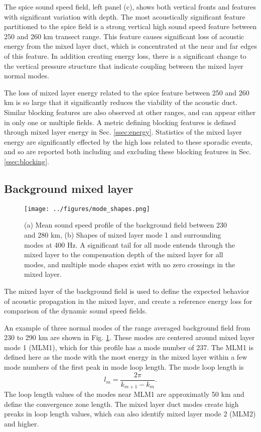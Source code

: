\documentclass[preprint,NumberedRefs]{JASA}
\begin{document}
The spice sound speed field, left panel (c), shows both vertical fronts and features with significant variation with depth. The most acoustically significant feature partitioned to the spice field is a strong vertical high sound speed feature between 250 and 260 km transect range. This feature causes significant loss of acoustic energy from the mixed layer duct, which is concentrated at the near and far edges of this feature. In addition creating energy loss, there is a significant change to the vertical pressure structure that indicate coupling between the mixed layer normal modes.

The loss of mixed layer energy related to the spice feature between 250 and 260 km is so large that it significantly reduces the viability of the acoustic duct. Similar blocking features are also observed at other ranges, and can appear either in only one or multiple fields. A metric defining blocking features is defined through mixed layer energy in Sec. \ref{ssec:energy}. Statistics of the mixed layer energy are significantly effected by the high loss related to these sporadic events, and so are reported both including and excluding these blocking features in Sec. \ref{ssec:blocking}.

\subsection{Background mixed layer}\label{ssec:modes}
\begin{figure}
\texttt{[image: ../figures/mode\_shapes.png]}
    \caption{\label{fig:bg_modes}{(a) Mean sound speed profile of the background field between 230 and 280 km, (b) Shapes of mixed layer mode 1 and surrounding modes at 400 Hz. A significant tail for all mode entends through the mixed layer to the compensation depth of the mixed layer for all modes, and multiple mode shapes exist with no zero crossings in the mixed layer.}}
\end{figure}
The mixed layer of the background field is used to define the expected behavior of acoustic propagation in the mixed layer, and create a reference energy loss for comparison of the dynamic sound speed fields.

An example of three normal modes of the range averaged background field from 230 to 290 km are shown in Fig. \ref{fig:bg_modes}. These modes are centered around mixed layer mode 1 (MLM1), which for this profile has a mode number of 237. The MLM1 is defined here as the mode with the most energy in the mixed layer within a few mode numbers of the first peak in mode loop length\citep{jensen2011computational}. The mode loop length is
\begin{equation}
    l_{m} = \frac{2 \pi}{k_{m+1} - k_m}.
    \label{eq:loop_length}
\end{equation}
The loop length values of the modes near MLM1 are approximatly 50 km and define the convergence zone length. The mixed layer duct modes create high preaks in loop length values, which can also identify mixed layer mode 2 (MLM2) and higher.
\end{document}
